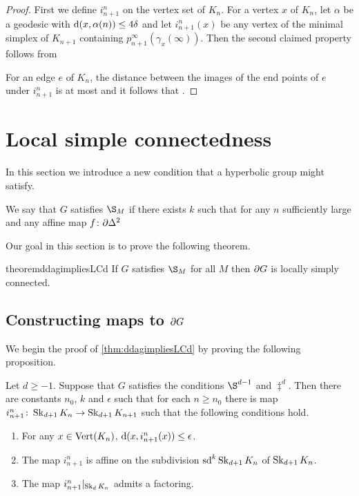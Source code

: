 \documentclass[a4paper]{article}
\begin{document}
\begin{proof}
  First we define $i^n_{n+1}$ on the vertex set of $K_n$. For a vertex $x$ of
  $K_n$, let $\alpha$ be a geodesic with $\operatorname{d}(x, \alpha(n)) \leq 4\delta$ and
  let $i^n_{n+1}(x)$ be any vertex of the minimal simplex of $K_{n+1}$
  containing $p^\infty_{n+1}(\gamma_x(\infty))$. Then the second claimed
  property follows from 

  For an edge $e$ of $K_n$, the distance between the images of the end points
  of $e$ under $i^n_{n+1}$ is at most  and it follows that .
\end{proof}

\section{Local simple connectedness}

\begin{proposition}\label{prop:extendingaffinemaps2}
\end{proposition}

In this section we introduce a new condition that a hyperbolic group might
satisfy. 

\begin{definition}
  We say that $G$ satisfies $\S_M$ if there exists $k$ such that for any $n$
  sufficiently large and any affine map $f\colon \partial\Delta^2$ 
\end{definition}

Our goal in this section is to prove the following theorem.

\begin{restatable}{theorem}{ddagimpliesLCd}\label{thm:ddagimpliesLCd}
  If $G$ satisfies $\S_M$ for all $M$ then $\partial G$ is locally simply
  connected.
\end{restatable}

\subsection{Constructing maps to $\partial G$}

We begin the proof of \cref{thm:ddagimpliesLCd} by proving the following 
proposition.

\begin{proposition}\label{prop:ddag_implies_i}
  Let $d \geq -1$. Suppose that $G$ satisfies the conditions $\S^{d-1}$ and
  $\ddag^{d}$. Then there are constants $n_0$, $k$ and $\epsilon$ such that for
  each $n\geq n_0$ there is map $i^n_{n+1}\colon\operatorname{Sk}_{d+1} K_n \to \operatorname{Sk}_{d+1}
  K_{n+1}$ such that the following conditions hold.
  \begin{enumerate}
    \item For any $x \in \operatorname{Vert}(K_n)$, $\operatorname{d}(x, i_{n+1}^n(x)) \leq
      \epsilon$.
    \item The map $i^n_{n+1}$ is affine on the subdivision $\operatorname{sd}^k\operatorname{Sk}_{d+1}
      K_n$ of $\operatorname{Sk}_{d+1}K_n$.
    \item The map $i^n_{n+1}\vert_{\operatorname{Sk}_d K_n}$ admits a factoring.
  \end{enumerate}
\end{proposition}
\end{document}
